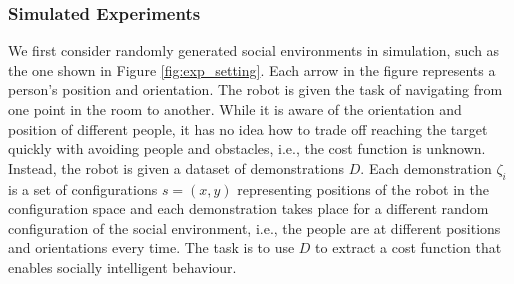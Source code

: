 \documentclass[a4paper,11pt]{report}
\begin{document}
	\subsubsection{Simulated Experiments}
	We first consider randomly generated social environments in simulation, such as the one shown in Figure \ref{fig:exp_setting}. Each arrow in the figure represents a person's position and orientation. The robot is given the task of navigating from one point in the room to another. While it is aware of the orientation and position of different people, it has no idea how to trade off reaching the target quickly with avoiding people and obstacles, i.e., the cost function is unknown. Instead, the robot is given a dataset of demonstrations $D$. Each demonstration $\zeta_i$ is a set of configurations $s = (x,y)$ representing positions of the robot in the configuration space and each demonstration takes place for a different random configuration of the social environment, i.e., the people are at different positions and orientations every time. The task is to use $D$ to extract a cost function that enables socially intelligent behaviour.
\end{document}
